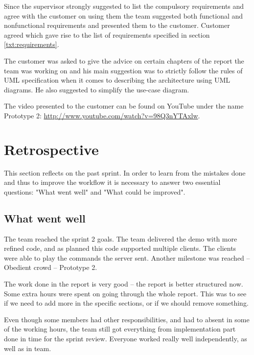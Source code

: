 Since the supervisor strongly suggested to list the compulsory requirements and agree with the customer on using them the team suggested both functional and nonfunctional requirements and presented them to the customer. Customer agreed which gave rise to the list of requirements specified in section \ref{txt:requirements}.

The customer was asked to give the advice on certain chapters of the report the team was working on and his main suggestion was to strictly follow the rules of UML specification when it comes to describing the architecture using UML diagrams. He also suggested to simplify the use-case diagram.

The video presented to the customer can be found on YouTube under the name Prototype 2: \url{http://www.youtube.com/watch?v=98Q3nYTAxlw}.

\section{Retrospective}
This section reflects on the past sprint. In order to learn from the mistakes done and thus to improve the workflow it is necessary to answer two essential questions: "What went well" and "What could be improved".

\subsection{What went well}
The team reached the sprint 2 goals. 
The team delivered the demo with more refined code, and as planned this code supported multiple clients. 
The clients were able to play the commands the server sent.
Another milestone was reached -- Obedient crowd -- Prototype 2.

The work done in the report is very good -- the report is better structured now.
Some extra hours were spent on going through the whole report. 
This was to see if we need to add more in the specific sections, or if we should remove something.  

Even though some members had other responsibilities, and had to absent in some of the working hours, the team still got everything from implementation part done in time for the sprint review. Everyone worked really well independently, as well as in team. 



